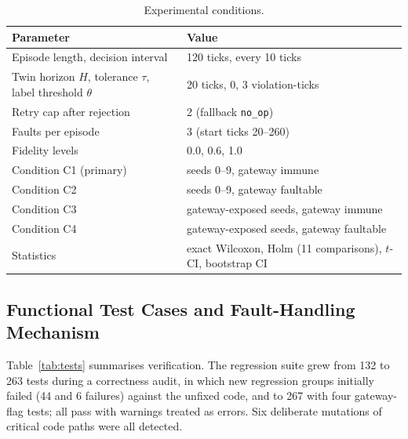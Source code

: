 \documentclass[conference]{IEEEtran}
\begin{document}
\begin{table}[t]
\centering
\caption{Experimental conditions.}
\label{tab:conditions}
\footnotesize
\begin{tabular}{@{}p{}p{}@{}}
\toprule
Parameter & Value \\
\midrule
Episode length, decision interval & 120 ticks, every 10 ticks \\
Twin horizon $H$, tolerance $\tau$, label threshold $\theta$ & 20 ticks, 0, 3 violation-ticks \\
Retry cap after rejection & 2 (fallback \texttt{no\_op}) \\
Faults per episode & 3 (start ticks 20--260) \\
Fidelity levels & 0.0, 0.6, 1.0 \\
Condition C1 (primary) & seeds 0--9, gateway immune \\
Condition C2 & seeds 0--9, gateway faultable \\
Condition C3 & gateway-exposed seeds, gateway immune \\
Condition C4 & gateway-exposed seeds, gateway faultable \\
Statistics & exact Wilcoxon, Holm (11 comparisons), $t$-CI, bootstrap CI \\
\bottomrule
\end{tabular}
\end{table}

\subsection{Functional Test Cases and Fault-Handling Mechanism}

Table~\ref{tab:tests} summarises verification. The regression suite grew from 132 to 263 tests during a correctness audit, in which new regression groups initially failed (44 and 6 failures) against the unfixed code, and to 267 with four gateway-flag tests; all pass with warnings treated as errors. Six deliberate mutations of critical code paths were all detected.
\end{document}
